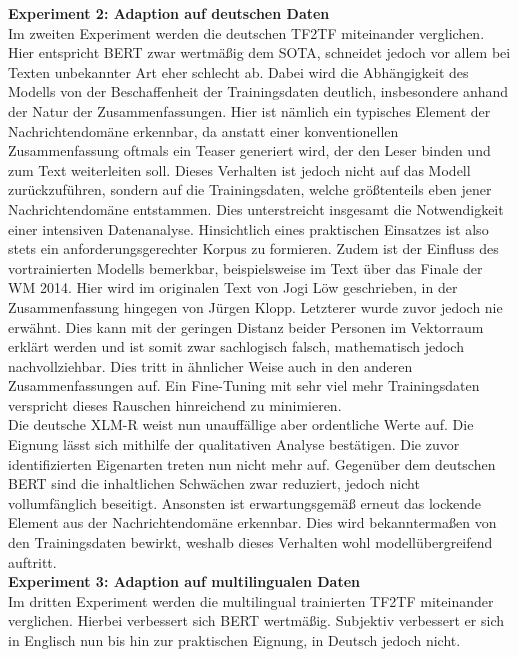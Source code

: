 \noindent
\textbf{Experiment 2: Adaption auf deutschen Daten}\\
\noindent
Im zweiten Experiment werden die deutschen \ac{TF2TF} miteinander verglichen. Hier entspricht \ac{BERT} zwar wertmäßig dem \ac{SOTA}, schneidet jedoch vor allem bei Texten unbekannter Art eher schlecht ab. Dabei wird die Abhängigkeit des Modells von der Beschaffenheit der Trainingsdaten deutlich, insbesondere anhand der Natur der Zusammenfassungen. Hier ist nämlich ein typisches Element der Nachrichtendomäne erkennbar, da anstatt einer konventionellen Zusammenfassung oftmals ein Teaser generiert wird, der den Leser binden und zum Text weiterleiten soll. Dieses Verhalten ist jedoch nicht auf das Modell zurückzuführen, sondern auf die Trainingsdaten, welche größtenteils eben jener Nachrichtendomäne entstammen. Dies unterstreicht insgesamt die Notwendigkeit einer intensiven Datenanalyse. Hinsichtlich eines praktischen Einsatzes ist also stets ein anforderungsgerechter Korpus zu formieren. Zudem ist der Einfluss des vortrainierten Modells bemerkbar, beispielsweise im Text über das Finale der WM 2014. Hier wird im originalen Text von Jogi Löw geschrieben, in der Zusammenfassung hingegen von Jürgen Klopp. Letzterer wurde zuvor jedoch nie erwähnt. Dies kann mit der geringen Distanz beider Personen im Vektorraum erklärt werden und ist somit zwar sachlogisch falsch, mathematisch jedoch nachvollziehbar. Dies tritt in ähnlicher Weise auch in den anderen Zusammenfassungen auf. Ein Fine-Tuning mit sehr viel mehr Trainingsdaten verspricht dieses Rauschen hinreichend zu minimieren.\\

\noindent
Die deutsche \ac{XLM-R} weist nun unauffällige aber ordentliche Werte auf. Die Eignung lässt sich mithilfe der qualitativen Analyse bestätigen. Die zuvor identifizierten Eigenarten treten nun nicht mehr auf. Gegenüber dem deutschen \ac{BERT} sind die inhaltlichen Schwächen zwar reduziert, jedoch nicht vollumfänglich beseitigt. Ansonsten ist erwartungsgemäß erneut das lockende Element aus der Nachrichtendomäne erkennbar. Dies wird bekanntermaßen von den Trainingsdaten bewirkt, weshalb dieses Verhalten wohl modellübergreifend auftritt.\\

\noindent
\textbf{Experiment 3: Adaption auf multilingualen Daten}\\
\noindent
Im dritten Experiment werden die multilingual trainierten \ac{TF2TF} miteinander verglichen. Hierbei verbessert sich \ac{BERT} wertmäßig. Subjektiv verbessert er sich in Englisch nun bis hin zur praktischen Eignung, in Deutsch jedoch nicht.\\


